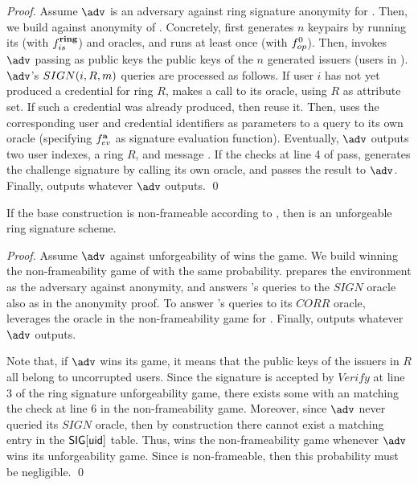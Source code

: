 \begin{proof}
  Assume $\adv$ is an adversary against ring signature anonymity for \CUASRing.
  Then, we build \advB against anonymity of \CUASGen. Concretely, \advB first
  generates $n$ keypairs by running its \IGEN (with $f_{is}^{\mathbf{ring}}$) and
  \HUGEN oracles, and runs \OGEN at least once (with $f_{op}^0$). Then, invokes
  $\adv$ passing as public keys the public keys of the $n$ generated issuers
  (users in \CUASRing). $\adv$'s $SIGN(i,R,m)$ queries are processed as
  follows. If user $i$ has not yet produced a credential for ring $R$, \advB
  makes a call to its \OBTAIN oracle, using $R$ as attribute set. If such a
  credential was already produced, then reuse it. Then, \advB uses the
  corresponding user and credential identifiers as parameters to a query to its
  own \SIGN oracle (specifying $f_{ev}^{\mathbf{a}}$ as signature evaluation
  function). Eventually, $\adv$ outputs two user indexes, a ring $R$, and
  message \msg. If the checks at line 4 of  pass, \advB
  generates the challenge signature by calling its own \CHALb oracle, and passes
  the result to $\adv$. Finally, \advB outputs whatever $\adv$ outputs.
  \qed
\end{proof}

\begin{theorem}
  If the base \CUASGen construction is non-frameable according to
  , then \CUASRing is an unforgeable ring signature
  scheme.
\end{theorem}

\begin{proof}
  Assume $\adv$ against unforgeability of \CUASRing wins the game. We build
  \advB winning the non-frameability game of \CUASGen with the same probability.
  \advB prepares the environment as the adversary \advB against anonymity,
  and answers \adv's queries to the $SIGN$ oracle also as in the anonymity
  proof. To answer \adv's queries to its $CORR$ oracle, \advB leverages the
  \ICORR oracle in the non-frameability game for \UAS. Finally, \advB outputs
  whatever $\adv$ outputs.

  Note that, if $\adv$ wins its game, it means that the public keys of the
  issuers in $R$ all belong to uncorrupted users. Since the signature is
  accepted by $Verify$ at line 3 of the ring signature unforgeability game,
  there exists some \uid with an \usk matching the check at line 6 in the
  non-frameability game. Moreover, since $\adv$ never queried its $SIGN$
  oracle, then by construction there cannot exist a matching entry in the
  $\mathsf{SIG}[\mathsf{uid}]$ table. Thus, \advB wins the non-frameability game whenever
  $\adv$ wins its unforgeability game. Since \CUASGen is non-frameable, then
  this probability must be negligible.
  \qed
\end{proof}

